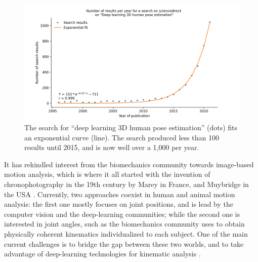 


\begin{figure}[hbtp]
	\centering
	\def\svgwidth{1\columnwidth}
	\fontsize{10pt}{10pt}\selectfont
	\includegraphics[width=\linewidth]{"../Chap1/Figures/Fig_exp.png"}
	\caption{The search for “deep learning 3D human pose estimation” (dots) fits an exponential curve (line). The search produced less than 100 results until 2015, and is now well over a 1,000 per year.}
	\label{fig_exp}
\end{figure}

It has rekindled interest from the biomechanics community towards image-based motion analysis, which is where it all started with the invention of chronophotography in the 19th century by Marey in France, and Muybridge in the USA \cite{Baker2007}. Currently, two approaches coexist in human and animal motion analysis: the first one mostly focuses on joint positions, and is lead by the computer vision and the deep-learning communities; while the second one is interested in joint angles, such as the biomechanics community uses to obtain physically coherent kinematics individualized to each subject. One of the main current challenges is to bridge the gap between these two worlds, and to take advantage of deep-learning technologies for kinematic analysis \cite{Cronin2021,Seethapathi2019}. 

